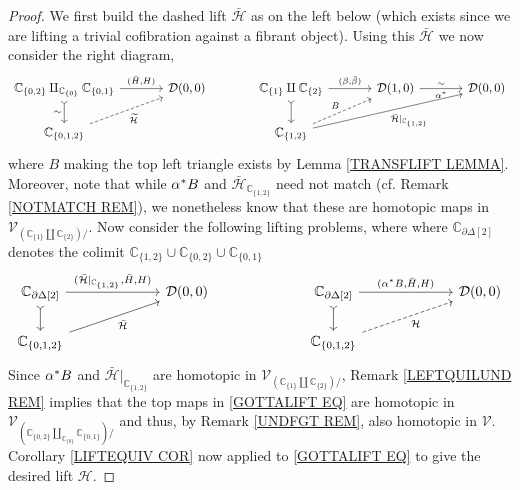 \documentclass[a4paper,10pt
,draft
]{article}%
\numberwithin{equation}{section}
\numberwithin{figure}{section}
\theoremstyle{definition} %
\newcommand{\V}{\ensuremath{\mathcal V}}
\newcommand{\1}{\ensuremath{\mathbbm 1}}%
\begin{document}
\begin{proof}
We first build the dashed lift $\bar{\mathcal{H}}$
as on the left below (which exists since we are lifting a trivial cofibration against a fibrant object).
Using this $\bar{\mathcal{H}}$ we now consider the right diagram,
\begin{equation}
\begin{tikzcd}[column sep = 35pt]
	\mathbb{C}_{\{0,2\}} 
	\amalg_{\mathbb{C}_{\{0\}}}
	\mathbb{C}_{\{0,1\}} 
	\ar[rightarrowtail]{d}[swap]{\sim}
	\arrow{r}{(\bar{H},H)}
&
	\mathcal{D}(0,0)
&%
	\mathbb{C}_{\{1\}} \amalg \mathbb{C}_{\{2\}}
	\ar[rightarrowtail]{d}
	\arrow{r}{(\beta,\bar{\beta})}
&
	\mathcal{D}(1,0)
	\ar{r}{\sim}[swap]{\alpha^{\**}}
&
	\mathcal{D}(0,0) 
\\
	\mathbb{C}_{\{0,1,2\}}
	\arrow[dashed]{ur}[swap]{\widetilde{\mathcal{H}}}
&
&%
	\mathbb{C}_{\{1,2\}}
	\ar[dashed]{ru}{B}
	\ar{rru}[swap]{\bar{\mathcal{H}}|_{\mathbb{C}_{\{1,2\}}}}
&
&
\end{tikzcd}
\end{equation}
where $B$ making the top left triangle exists by Lemma \ref{TRANSFLIFT LEMMA}.
Moreover, note that while 
$\alpha^{\**}B$ and $\bar{\mathcal{H}}_{\mathbb{C}_{\{1,2\}}}$
need not match (cf. Remark \ref{NOTMATCH REM}),
we nonetheless know that these are homotopic maps
in $\V_{\left(\mathbb{C}_{\{1\}} \amalg \mathbb{C}_{\{2\}}\right)/}$.
Now consider the following lifting problems, 
where
where $\mathbb{C}_{\partial \Delta[2]}$ denotes the colimit %
$\mathbb{C}_{\{1,2\}} \cup \mathbb{C}_{\{0,2\}} \cup \mathbb{C}_{\{0,1\}}$
\begin{equation}\label{GOTTALIFT EQ}
\begin{tikzcd}[column sep = 65pt]
	\mathbb{C}_{\partial \Delta[2]}
	\ar[rightarrowtail]{d}
	\arrow{r}{(\bar{\mathcal{H}}|_{\mathbb{C}_{\{1,2\}}},\bar{H},H)}
&
	\mathcal{D}(0,0)
&%
	\mathbb{C}_{\partial \Delta[2]}
	\ar[rightarrowtail]{d}
	\arrow{r}{(\alpha^{\**}B,\bar{H},H)}
&
	\mathcal{D}(0,0)
\\
	\mathbb{C}_{\{0,1,2\}} \ar{ru}[swap]{\bar{\mathcal{H}}}
&
&%
	\mathbb{C}_{\{0,1,2\}} \ar[dashed]{ru}[swap]{\mathcal{H}}
&
\end{tikzcd}
\end{equation}
Since $\alpha^{\**}B$ and $\bar{\mathcal{H}}|_{\mathbb{C}_{\{1,2\}}}$
are homotopic in 
$\V_{\left(\mathbb{C}_{\{1\}} \amalg \mathbb{C}_{\{2\}}\right)/}$,
Remark \ref{LEFTQUILUND REM}
implies that the top maps in \eqref{GOTTALIFT EQ}
are homotopic in 
$\V_{\left(
\mathbb{C}_{\{0,2\}} \amalg_{\mathbb{C}_{\{0\}}} \mathbb{C}_{\{0,1\}}
\right)/}$ and thus,
by Remark \ref{UNDFGT REM}, also homotopic in 
$\V$.
Corollary \ref{LIFTEQUIV COR} now applied to \eqref{GOTTALIFT EQ}
to give the desired lift $\mathcal{H}$.
\end{proof}
\end{document}
